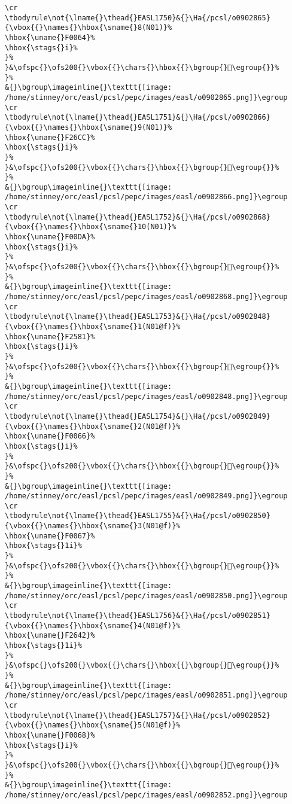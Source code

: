 \begin{verbatim}
\cr
\tbodyrule\not{\lname{}\thead{}EASL1750}&{}\Ha{/pcsl/o0902865}{\vbox{{}\names{}\hbox{\sname{}8(N01)}%
\hbox{\uname{}F0064}%
\hbox{\stags{}i}%
}%
}&\ofspc{}\ofs200{}\vbox{{}\chars{}\hbox{{}\bgroup{}󰁤\egroup{}}%
}%
&{}\bgroup\imageinline{}\texttt{[image: /home/stinney/orc/easl/pcsl/pepc/images/easl/o0902865.png]}\egroup
\cr
\tbodyrule\not{\lname{}\thead{}EASL1751}&{}\Ha{/pcsl/o0902866}{\vbox{{}\names{}\hbox{\sname{}9(N01)}%
\hbox{\uname{}F26CC}%
\hbox{\stags{}i}%
}%
}&\ofspc{}\ofs200{}\vbox{{}\chars{}\hbox{{}\bgroup{}󲛌\egroup{}}%
}%
&{}\bgroup\imageinline{}\texttt{[image: /home/stinney/orc/easl/pcsl/pepc/images/easl/o0902866.png]}\egroup
\cr
\tbodyrule\not{\lname{}\thead{}EASL1752}&{}\Ha{/pcsl/o0902868}{\vbox{{}\names{}\hbox{\sname{}10(N01)}%
\hbox{\uname{}F00DA}%
\hbox{\stags{}i}%
}%
}&\ofspc{}\ofs200{}\vbox{{}\chars{}\hbox{{}\bgroup{}󰃚\egroup{}}%
}%
&{}\bgroup\imageinline{}\texttt{[image: /home/stinney/orc/easl/pcsl/pepc/images/easl/o0902868.png]}\egroup
\cr
\tbodyrule\not{\lname{}\thead{}EASL1753}&{}\Ha{/pcsl/o0902848}{\vbox{{}\names{}\hbox{\sname{}1(N01@f)}%
\hbox{\uname{}F2581}%
\hbox{\stags{}i}%
}%
}&\ofspc{}\ofs200{}\vbox{{}\chars{}\hbox{{}\bgroup{}󲖁\egroup{}}%
}%
&{}\bgroup\imageinline{}\texttt{[image: /home/stinney/orc/easl/pcsl/pepc/images/easl/o0902848.png]}\egroup
\cr
\tbodyrule\not{\lname{}\thead{}EASL1754}&{}\Ha{/pcsl/o0902849}{\vbox{{}\names{}\hbox{\sname{}2(N01@f)}%
\hbox{\uname{}F0066}%
\hbox{\stags{}i}%
}%
}&\ofspc{}\ofs200{}\vbox{{}\chars{}\hbox{{}\bgroup{}󰁦\egroup{}}%
}%
&{}\bgroup\imageinline{}\texttt{[image: /home/stinney/orc/easl/pcsl/pepc/images/easl/o0902849.png]}\egroup
\cr
\tbodyrule\not{\lname{}\thead{}EASL1755}&{}\Ha{/pcsl/o0902850}{\vbox{{}\names{}\hbox{\sname{}3(N01@f)}%
\hbox{\uname{}F0067}%
\hbox{\stags{}1i}%
}%
}&\ofspc{}\ofs200{}\vbox{{}\chars{}\hbox{{}\bgroup{}󰁧\egroup{}}%
}%
&{}\bgroup\imageinline{}\texttt{[image: /home/stinney/orc/easl/pcsl/pepc/images/easl/o0902850.png]}\egroup
\cr
\tbodyrule\not{\lname{}\thead{}EASL1756}&{}\Ha{/pcsl/o0902851}{\vbox{{}\names{}\hbox{\sname{}4(N01@f)}%
\hbox{\uname{}F2642}%
\hbox{\stags{}1i}%
}%
}&\ofspc{}\ofs200{}\vbox{{}\chars{}\hbox{{}\bgroup{}󲙂\egroup{}}%
}%
&{}\bgroup\imageinline{}\texttt{[image: /home/stinney/orc/easl/pcsl/pepc/images/easl/o0902851.png]}\egroup
\cr
\tbodyrule\not{\lname{}\thead{}EASL1757}&{}\Ha{/pcsl/o0902852}{\vbox{{}\names{}\hbox{\sname{}5(N01@f)}%
\hbox{\uname{}F0068}%
\hbox{\stags{}i}%
}%
}&\ofspc{}\ofs200{}\vbox{{}\chars{}\hbox{{}\bgroup{}󰁨\egroup{}}%
}%
&{}\bgroup\imageinline{}\texttt{[image: /home/stinney/orc/easl/pcsl/pepc/images/easl/o0902852.png]}\egroup

\end{verbatim}
